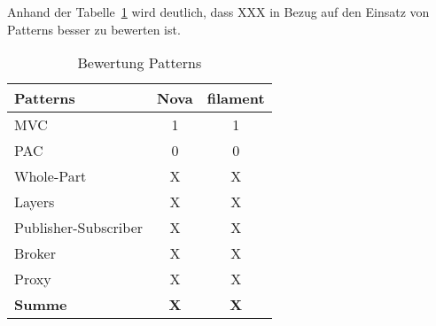 \color{red}
Anhand der Tabelle~\ref{tab:bewertung-patterns} wird deutlich, dass XXX in Bezug auf den Einsatz von Patterns besser zu bewerten ist.

\begin{table}[]
    \caption{Bewertung Patterns}
    \label{tab:bewertung-patterns}
    \centering
    \begin{tabular}{|l|c|c|}
        \hline
        \textbf{Patterns}    & \textbf{Nova} & \textbf{filament} \\ \hline
        MVC                  & 1             & 1                 \\ \hline
        PAC                  & 0             & 0                 \\ \hline
        Whole-Part           & X             & X                 \\ \hline
        Layers               & X             & X                 \\ \hline
        Publisher-Subscriber & X             & X                 \\ \hline
        Broker               & X             & X                 \\ \hline
        Proxy                & X             & X                 \\ \hline
        \textbf{Summe}       & \textbf{X}    & \textbf{X}        \\ \hline
    \end{tabular}
\end{table}
\color{black}
